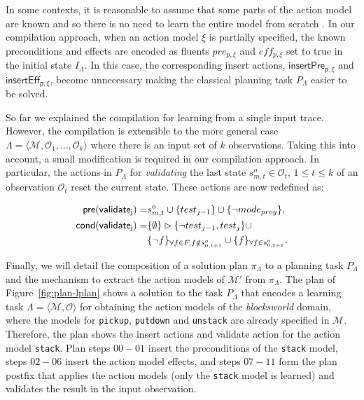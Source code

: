 \documentclass[runningheads]{llncs}
\newcommand{\tup}[1]{{\langle #1 \rangle}}
\newcommand{\pre}{\mathsf{pre}}     %
\newcommand{\cond}{\mathsf{cond}}   %
\begin{document}
In some contexts, it is reasonable to assume that some parts of the action model are known and so there is no need to learn the entire model from scratch \cite{ZhuoNK13}. In our compilation approach, when an action model $\xi$ is partially specified, the known preconditions and effects are encoded as fluents $pre_{p,\xi}$ and $eff_{p,\xi}$ set to true in the initial state $I_{\Lambda}$. In this case, the corresponding insert actions, $\mathsf{insertPre_{p,\xi}}$ and $\mathsf{insertEff_{p,\xi}}$, become unnecessary making the classical planning task $P_{\Lambda}$ easier to be solved.

So far we explained the compilation for learning from a single input trace. However, the compilation is extensible to the more general case $\Lambda=\tup{\mathcal{M},\mathcal{O}_1,\ldots,\mathcal{O}_k}$ where there is an input set of $k$ observations. Taking this into account, a small modification is required in our compilation approach. In particular, the actions in $P_{\Lambda}$ for {\em validating} the last state $s_{m,t}^o\in \mathcal{O}_t$, {\tt\small $1\leq t\leq k$} of an observation $\mathcal{O}_t$ reset the current state. These actions are now redefined as:

\begin{small}
	\begin{align*}
	\hspace*{7pt}\pre(\mathsf{validate_{j}})=&s_{m,t}^o\cup\{test_{j-1}\}\cup
	\{\neg mode_{prog}\},\\
	\cond(\mathsf{validate_{j}})=&\{\emptyset\}\rhd\{\neg
	test_{j-1},test_j\} \cup \\
	&\{\neg f\}_{\forall f\in F, f \notin s_{0,t+1}^o}\cup \{f\}_{\forall
		f\in s_{0,t+1}^o}.
	\end{align*}
\end{small}

Finally, we will detail the composition of a solution plan $\pi_\Lambda$ to a planning task $P_\Lambda$ and the mechanism to extract the action models of $\mathcal{M}'$ from $\pi_\Lambda$. The plan of Figure~\ref{fig:plan-lplan} shows a solution to the task $P_{\Lambda}$ that encodes a learning task $\Lambda=\tup{\mathcal{M},\mathcal{O}}$ for obtaining the action models of the {\em blocksworld} domain, where the models for {\tt\small pickup}, {\tt\small putdown} and {\tt\small unstack} are already specified in $\mathcal{M}$. Therefore, the plan shows the insert actions and validate action for the action model {\tt\small stack}. Plan steps $00-01$ insert the preconditions of the {\tt\small stack} model, steps $02-06$ insert the action model effects, and steps $07-11$ form the plan postfix that applies the action models (only the {\tt\small stack} model is learned) and validates the result in the input observation.
\end{document}
